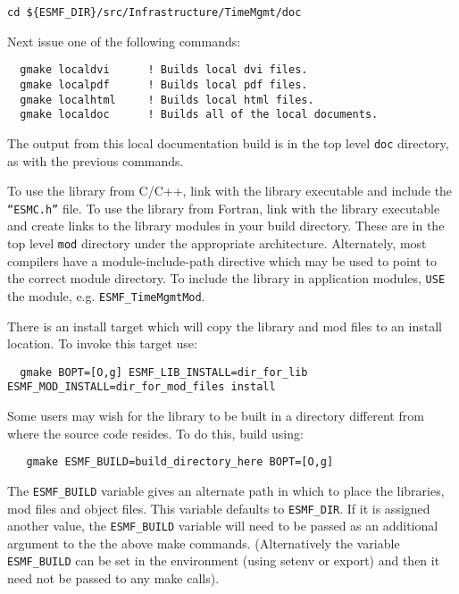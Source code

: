 \begin{verbatim}
cd ${ESMF_DIR}/src/Infrastructure/TimeMgmt/doc
\end{verbatim}

\noindent Next issue one of the following commands:
\begin{verbatim}
  gmake localdvi      ! Builds local dvi files.
  gmake localpdf      ! Builds local pdf files.
  gmake localhtml     ! Builds local html files.
  gmake localdoc      ! Builds all of the local documents.
\end{verbatim}

\noindent The output from this local documentation build is in the top level {\tt doc}
directory, as with the previous commands.

\smallskip

To use the library from C/C++, link with the library executable and include
the {\tt ``ESMC.h''} file.
To use the library from Fortran, link with the library executable and
create links to the library modules in your build directory.  These are
in the top level {\tt mod} directory under the appropriate architecture.  Alternately, 
most compilers have a module-include-path directive which may be used to point
to the correct module directory.
To include the library in application modules, {\tt USE} the
module, e.g. {\tt ESMF\_TimeMgmtMod}.  

There is an install target which will copy the library and mod files to an
install location.  To invoke this target use:
\begin{verbatim}
  gmake BOPT=[O,g] ESMF_LIB_INSTALL=dir_for_lib ESMF_MOD_INSTALL=dir_for_mod_files install 
\end{verbatim}

Some users may wish for the library to be built in a directory different from 
where the source code resides.  To do this, build using:
\begin{verbatim}
   gmake ESMF_BUILD=build_directory_here BOPT=[O,g]
\end{verbatim}

The {\tt ESMF\_BUILD} variable gives an alternate path in which to place the libraries,
mod files and object files.  This variable defaults to {\tt ESMF\_DIR}.  If it is 
assigned another value, the {\tt ESMF\_BUILD} variable will need to be passed as
an additional argument to the the above make commands.  (Alternatively the variable
{\tt ESMF\_BUILD} can be set in the environment (using setenv or export) and then it 
need not be passed to any make calls).

